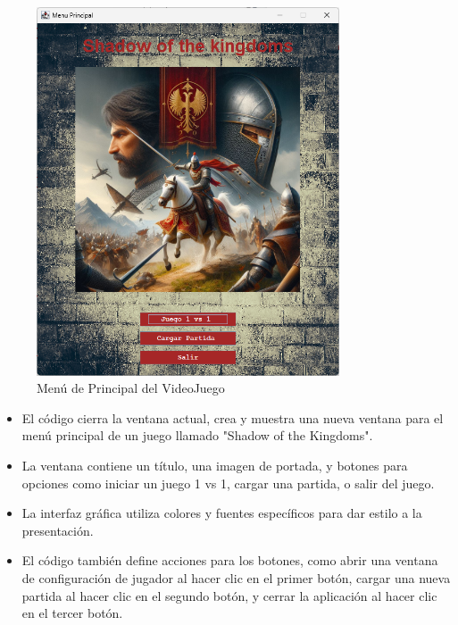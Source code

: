 \documentclass{article}
\begin{document}
    
    \begin{figure}[H]
        \centering
		\includegraphics[width=0.8\textwidth,keepaspectratio]{img/Menu_Principal.png}
        \caption{Menú de Principal del VideoJuego}
    \end{figure}

    \begin{itemize}	
		\item El código cierra la ventana actual, crea y muestra una nueva ventana para el menú principal de un juego llamado "Shadow of the Kingdoms".
            \item La ventana contiene un título, una imagen de portada, y botones para opciones como iniciar un juego 1 vs 1, cargar una partida, o salir del juego.
            \item La interfaz gráfica utiliza colores y fuentes específicos para dar estilo a la presentación.
            \item El código también define acciones para los botones, como abrir una ventana de configuración de jugador al hacer clic en el primer botón, cargar una nueva partida al hacer clic en el segundo botón, y cerrar la aplicación al hacer clic en el tercer botón.
    \end{itemize}
\end{document}
